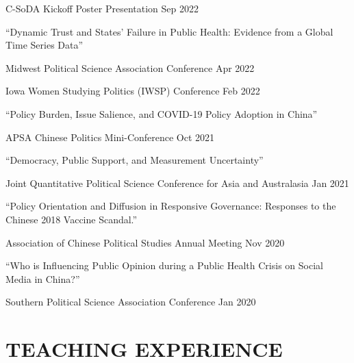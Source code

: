 \documentclass[10.5pt,]{article}
\providecommand{\tightlist}{%
	\setlength{\itemsep}{0pt}\setlength{\parskip}{0pt}}
\renewenvironment{itemize}{
	\begin{list}{}{
			\setlength{\leftmargin}{1.5em}
		}
	}{
	\end{list}
}
\begin{document}
\begin{itemize}
  \begin{itemize}
  \tightlist
  \item
    C-SoDA Kickoff Poster Presentation \hfill Sep 2022
  \end{itemize}
\item
  ``Dynamic Trust and States' Failure in Public Health: Evidence from a
  Global Time Series Data''

  \begin{itemize}
  \tightlist
  \item
    Midwest Political Science Association Conference \hfill Apr 2022
  \item
    Iowa Women Studying Politics (IWSP) Conference \hfill Feb 2022
  \end{itemize}
\item
  ``Policy Burden, Issue Salience, and COVID-19 Policy Adoption in
  China''

  \begin{itemize}
  \tightlist
  \item
    APSA Chinese Politics Mini-Conference \hfill Oct 2021
  \end{itemize}
\item
  ``Democracy, Public Support, and Measurement Uncertainty''

  \begin{itemize}
  \tightlist
  \item
    Joint Quantitative Political Science Conference for Asia and
    Australasia \hfill Jan 2021
  \end{itemize}
\item
  ``Policy Orientation and Diffusion in Responsive Governance: Responses
  to the Chinese 2018 Vaccine Scandal.''

  \begin{itemize}
  \tightlist
  \item
    Association of Chinese Political Studies Annual Meeting \hfill Nov
    2020
  \end{itemize}
\item
  ``Who is Influencing Public Opinion during a Public Health Crisis on
  Social Media in China?''

  \begin{itemize}
  \tightlist
  \item
    Southern Political Science Association Conference \hfill  Jan 2020
  \end{itemize}
\end{itemize}

\section{TEACHING EXPERIENCE}\label{teaching-experience}
\end{document}
